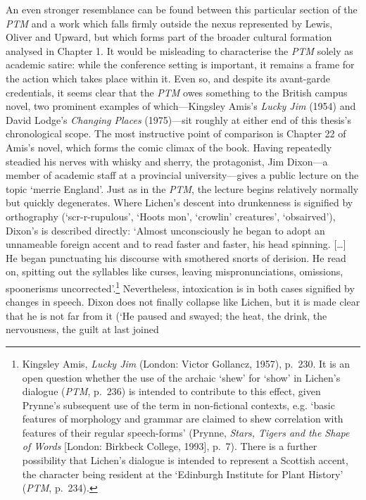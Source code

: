 \documentclass[]{article}
\begin{document}
An even stronger resemblance can be found between this particular
section of the \emph{PTM} and a work which falls firmly outside the
nexus represented by Lewis, Oliver and Upward, but which forms part of
the broader cultural formation analysed in Chapter 1. It would be
misleading to characterise the \emph{PTM} solely as academic satire:
while the conference setting is important, it remains a frame for the
action which takes place within it. Even so, and despite its avant-garde
credentials, it seems clear that the \emph{PTM} owes something to the
British campus novel, two prominent examples of which—Kingsley Amis’s
\emph{Lucky Jim} (1954) and David Lodge’s \emph{Changing Places}
(1975)—sit roughly at either end of this thesis’s chronological scope.
The most instructive point of comparison is Chapter 22 of Amis’s novel,
which forms the comic climax of the book. Having repeatedly steadied his
nerves with whisky and sherry, the protagonist, Jim Dixon—a member of
academic staff at a provincial university—gives a public lecture on the
topic ‘merrie England’. Just as in the \emph{PTM}, the lecture begins
relatively normally but quickly degenerates. Where Lichen’s descent into
drunkenness is signified by orthography (‘scr-r-rupulous’, ‘Hoots mon’,
‘crowlin’ creatures’, ‘obsairved’), Dixon’s is described directly:
‘Almost unconsciously he began to adopt an unnameable foreign accent and
to read faster and faster, his head spinning. {[}\ldots{}{]} He began
punctuating his discourse with smothered snorts of derision. He read on,
spitting out the syllables like curses, leaving mispronunciations,
omissions, spoonerisms uncorrected’.\footnote{Kingsley Amis, \emph{Lucky
  Jim} (London: Victor Gollancz, 1957), p.~230. It is an open question
  whether the use of the archaic ‘shew’ for ‘show’ in Lichen’s dialogue
  (\emph{PTM}, p.~236) is intended to contribute to this effect, given
  Prynne’s subsequent use of the term in non-fictional contexts, e.g.
  ‘basic features of morphology and grammar are claimed to shew
  correlation with features of their regular speech-forms’ (Prynne,
  \emph{Stars, Tigers and the Shape of Words} {[}London: Birkbeck
  College, 1993{]}, p.~7). There is a further possibility that Lichen’s
  dialogue is intended to represent a Scottish accent, the character
  being resident at the ‘Edinburgh Institute for Plant History’
  (\emph{PTM}, p.~234).} Nevertheless, intoxication is in both cases
signified by changes in speech. Dixon does not finally collapse like
Lichen, but it is made clear that he is not far from it (‘He paused and
swayed; the heat, the drink, the nervousness, the guilt at last joined
\end{document}
